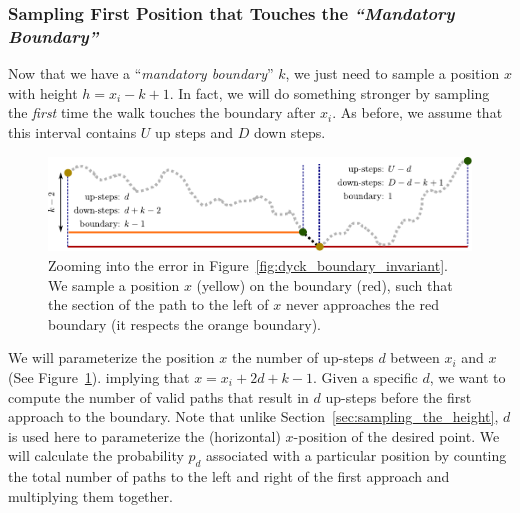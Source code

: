 \subsubsection{Sampling First Position that Touches the \emph{``Mandatory Boundary''}}
\label{sec:sampling_first_position_touching_mandatory_boundary}

Now that we have a ``\emph{mandatory boundary}'' $k$, we just need to sample a position $x$ with height $h = x_i-k+1$.
In fact, we will do something stronger by sampling the \emph{first} time the walk touches the boundary after $x_i$.
As before, we assume that this interval contains $U$ up steps and $D$ down steps.
\begin{figure}[htpb]
    \centering
    \includegraphics[width=\textwidth]{images/dyck_first_approach_sampling.pdf}
    \caption{Zooming into the error in Figure~\ref{fig:dyck_boundary_invariant}.
        We sample a position $x$ (yellow) on the boundary (red),
        such that the section of the path to the left of $x$ never approaches the red boundary (it respects the orange boundary).}
    \label{fig:dyck_mandatory_boundary_sampling}
\end{figure}

We will parameterize the position $x$ the number of up-steps $d$ between $x_i$ and $x$ (See Figure~\ref{fig:dyck_mandatory_boundary_sampling}).
implying that $x = x_{i} + 2d + k - 1$.
Given a specific $d$, we want to compute the number of valid paths that result in
$d$ up-steps before the first approach to the boundary.
Note that unlike Section~\ref{sec:sampling_the_height}, $d$ is used here to parameterize the (horizontal) $x$-position of the desired point.
We will calculate the probability $p_d$ associated with a particular position
by counting the total number of paths to the left and right of the first approach and multiplying them together.

